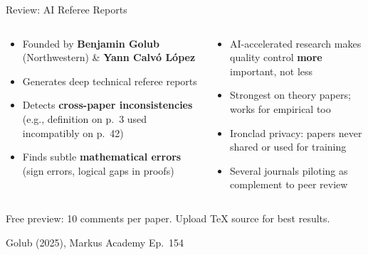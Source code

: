 \documentclass[aspectratio=169, 11pt]{beamer}
\newcommand{\emphgold}[1]{\alert{\textbf{#1}}}
\newcommand{\sourceref}[1]{\vspace{0.15cm}\hfill{\tiny\textcolor{medgray}{#1}}}
\begin{document}
\begin{frame}[shrink=17]{Review: AI Referee Reports}
\begin{columns}[T]
\begin{keyinsight}
\begin{itemize}
  \item Founded by \textbf{Benjamin Golub} (Northwestern) \& \textbf{Yann Calv\'{o} L\'{o}pez}
  \item Generates deep technical referee reports
  \item Detects \emphgold{cross-paper inconsistencies} (e.g., definition on p.~3 used incompatibly on p.~42)
  \item Finds subtle \emphgold{mathematical errors} (sign errors, logical gaps in proofs)
\end{itemize}
\end{keyinsight}

\begin{keyinsight}
\begin{itemize}
  \item AI-accelerated research makes quality control \emphgold{more} important, not less
  \item Strongest on theory papers; works for empirical too
  \item Ironclad privacy: papers never shared or used for training
  \item Several journals piloting as complement to peer review
\end{itemize}
\end{keyinsight}
\end{columns}
\vspace{0.15cm}
\begin{center}
\small Free preview: 10 comments per paper. Upload TeX source for best results.
\end{center}
\sourceref{Golub (2025), Markus Academy Ep.~154}
\end{frame}

\end{document}
